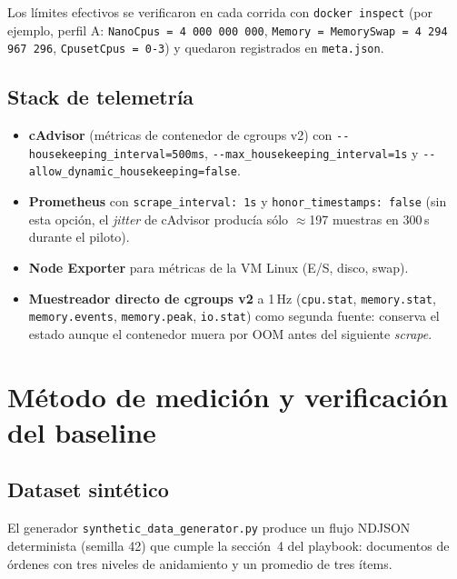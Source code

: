 \documentclass[11pt,a4paper]{article}
\begin{document}
Los límites efectivos se verificaron en cada corrida con \texttt{docker inspect} (por ejemplo, perfil A: \texttt{NanoCpus = 4\,000\,000\,000}, \texttt{Memory = MemorySwap = 4\,294\,967\,296}, \texttt{CpusetCpus = 0-3}) y quedaron registrados en \texttt{meta.json}.

\subsection{Stack de telemetría}

\begin{itemize}
  \item \textbf{cAdvisor} (métricas de contenedor de cgroups v2) con \texttt{-{}-housekeeping\_interval=500ms}, \texttt{-{}-max\_housekeeping\_interval=1s} y \texttt{-{}-allow\_dynamic\_housekeeping=false}.
  \item \textbf{Prometheus} con \texttt{scrape\_interval: 1s} y \texttt{honor\_timestamps: false} (sin esta opción, el \emph{jitter} de cAdvisor producía sólo $\approx$197 muestras en 300\,s durante el piloto).
  \item \textbf{Node Exporter} para métricas de la VM Linux (E/S, disco, swap).
  \item \textbf{Muestreador directo de cgroups v2} a 1\,Hz (\texttt{cpu.stat}, \texttt{memory.stat}, \texttt{memory.events}, \texttt{memory.peak}, \texttt{io.stat}) como segunda fuente: conserva el estado aunque el contenedor muera por OOM antes del siguiente \emph{scrape}.
\end{itemize}

\section{Método de medición y verificación del baseline}

\subsection{Dataset sintético}

El generador \texttt{synthetic\_data\_generator.py} produce un flujo NDJSON determinista (semilla 42) que cumple la sección~4 del playbook: documentos de órdenes con tres niveles de anidamiento y un promedio de tres ítems.
\end{document}
